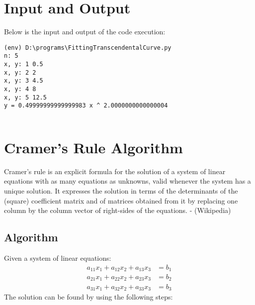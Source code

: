 \documentclass[12pt]{article}
\begin{document}
        \section*{Input and Output}
        \noindent Below is the input and output of the code execution:
                    
        {\small
        \begin{verbatim}
(env) D:\programs\FittingTranscendentalCurve.py
n: 5
x, y: 1 0.5
x, y: 2 2
x, y: 3 4.5
x, y: 4 8
x, y: 5 12.5
y = 0.49999999999999983 x ^ 2.0000000000000004
            
        \end{verbatim}
        }
        
        \newpage
        \section*{Cramer's Rule Algorithm}

        Cramer's rule is an explicit formula for the solution of a system of linear equations with as many equations as unknowns, valid whenever the system has a unique solution. It expresses the solution in terms of the determinants of the (square) coefficient matrix and of matrices obtained from it by replacing one column by the column vector of right-sides of the equations. 
        - (Wikipedia)
        
        \subsection*{Algorithm}
        
        Given a system of linear equations:
        \[
            \begin{aligned}
                a_{11}x_1 + a_{12}x_2 + a_{13}x_3 &= b_1 \\
                a_{21}x_1 + a_{22}x_2 + a_{23}x_3 &= b_2 \\
                a_{31}x_1 + a_{32}x_2 + a_{33}x_3 &= b_3
            \end{aligned}
            \]
            The solution can be found by using the following steps:
            
\end{document}

